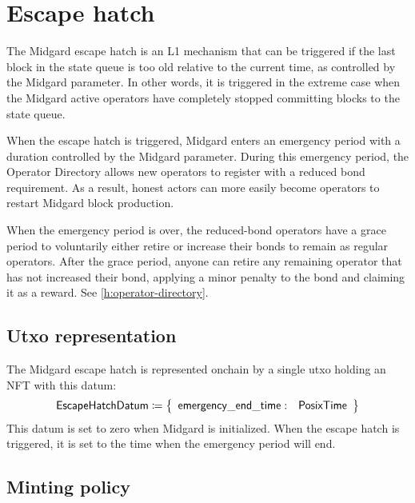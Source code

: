 \documentclass[../midgard.tex]{subfiles}
\begin{document}
\section{Escape hatch}
\label{h:escape-hatch}

The Midgard escape hatch is an L1 mechanism that can be triggered if the last block in the state queue is too old relative to the current time, as controlled by the Midgard  parameter.
In other words, it is triggered in the extreme case when the Midgard active operators have completely stopped committing blocks to the state queue.

When the escape hatch is triggered, Midgard enters an emergency period with a duration controlled by the Midgard  parameter.
During this emergency period, the Operator Directory allows new operators to register with a reduced bond requirement.
As a result, honest actors can more easily become operators to restart Midgard block production.

When the emergency period is over, the reduced-bond operators have a grace period to voluntarily either retire or increase their bonds to remain as regular operators.
After the grace period, anyone can retire any remaining operator that has not increased their bond, applying a minor penalty to the bond and claiming it as a reward.
See \cref{h:operator-directory}.

\subsection{Utxo representation}%
\label{h:escape-hatch-utxo-representation}%

The Midgard escape hatch is represented onchain by a single utxo holding an NFT with this datum:
\begin{equation*}
  \mathsf{EscapeHatchDatum} \coloneq \left\{
  \begin{array}{ll}
    \mathsf{emergency\_end\_time}: & \mathsf{PosixTime}
  \end{array}\right\}
\end{equation*}
This datum is set to zero when Midgard is initialized.
When the escape hatch is triggered, it is set to the time when the emergency period will end.

\subsection{Minting policy}%
\label{h:escape-hatch-minting-policy}%
\end{document}
